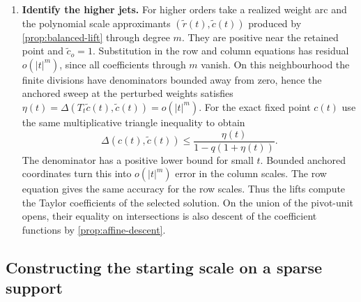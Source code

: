\documentclass[11pt,a4paper]{article}
\theoremstyle{definition}
\theoremstyle{remark}\newaliascnt{remark}{theorem}
\numberwithin{equation}{section}
\begin{document}
\begin{enumerate}[titledsteps]
    \item \textbf{Identify the higher jets.} For higher orders take a realized weight arc and the polynomial scale approximants $(\tilde r(t),\tilde c(t))$ produced by \cref{prop:balanced-lift} through degree $m$. They are positive near the retained point and $\tilde c_o=1$. Substitution in the row and column equations has residual $o(|t|^m)$, since all coefficients through $m$ vanish. On this neighbourhood the finite divisions have denominators bounded away from zero, hence the anchored sweep at the perturbed weights satisfies $\eta(t)=\Delta(T_t\tilde c(t),\tilde c(t))=o(|t|^m)$. For the exact fixed point $c(t)$ use the same multiplicative triangle inequality to obtain
\[
 \Delta(c(t),\tilde c(t))
 \le \frac{\eta(t)}{1-q(1+\eta(t))}.
\]
The denominator has a positive lower bound for small $t$. Bounded anchored coordinates turn this into $o(|t|^m)$ error in the column scales. The row equation gives the same accuracy for the row scales. Thus the lifts compute the Taylor coefficients of the selected solution. On the union of the pivot-unit opens, their equality on intersections is also descent of the coefficient functions by \cref{prop:affine-descent}.
\end{enumerate}

\subsection{Constructing the starting scale on a sparse support}\label{sec:sparse-solve}
\end{document}
